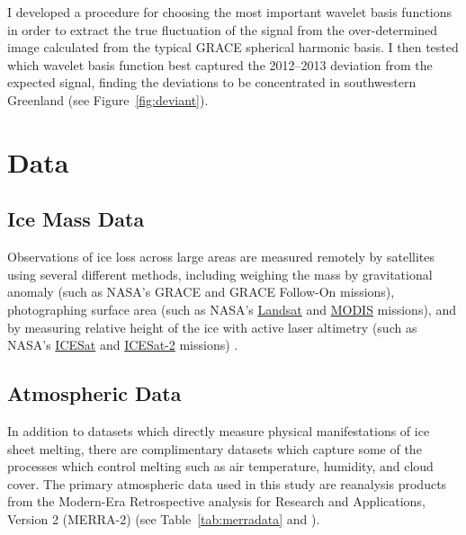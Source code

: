 \documentclass[11pt]{report}
\begin{document}
I developed a procedure for choosing the most important wavelet basis functions in order to extract the true fluctuation of the signal from the over-determined image calculated from the typical GRACE spherical harmonic basis. I then tested which wavelet basis function best captured the 2012--2013 deviation from the expected signal, finding the deviations to be concentrated in southwestern Greenland (see
Figure~\ref{fig:deviant}). 



\section{Data \label{sec:data}}

\subsection{Ice Mass Data}

Observations of ice loss across large areas are measured remotely by satellites using several different methods, including weighing the mass by gravitational anomaly (such as NASA's GRACE and GRACE Follow-On missions), photographing surface area (such as NASA's \href{https://landsat.gsfc.nasa.gov}{Landsat} and \href{https://terra.nasa.gov/about/terra-instruments/modis}{MODIS} missions), and by measuring relative height of the ice with active laser altimetry (such as NASA's \href{https://icesat.gsfc.nasa.gov/icesat/}{ICESat} and \href{https://icesat-2.gsfc.nasa.gov}{ICESat-2} missions) \cite[][]{khan2015}.

 
 \subsection{Atmospheric Data}
 
 
In addition to datasets which directly measure physical manifestations of ice sheet melting, there are complimentary datasets which capture some of the processes which control melting such as air temperature, humidity, and cloud cover. The primary atmospheric data used in this study are reanalysis products from the Modern-Era Retrospective analysis for Research and Applications, Version 2 (MERRA-2) (see Table~\ref{tab:merradata} and ). 
\end{document}

